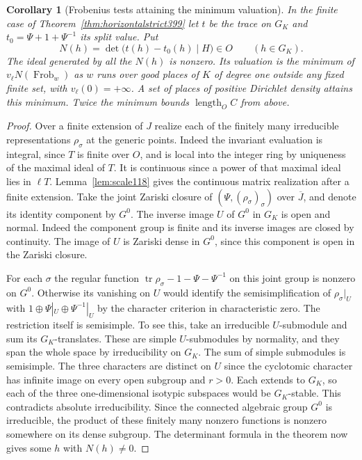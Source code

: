 \documentclass[a4paper,11pt]{article}
\newtheorem{corollary}[proposition]{Corollary}
\theoremstyle{definition}
\theoremstyle{remark}
\numberwithin{equation}{section}
\begin{document}
\begin{corollary}[Frobenius tests attaining the minimum valuation]\leavevmode
\label{cor:frobeniusstrict399}
In the finite case of Theorem~\ref{thm:horizontalstrict399} let
\(t\) be the trace on \(G_K\) and
\(t_0=\Psi+1+\Psi^{-1}\) its split value. Put
\[
     N(h)=\det\bigl(t(h)-t_0(h)\mid H\bigr)\in O
                               \qquad(h\in G_K).
\]
The ideal generated by all the \(N(h)\) is nonzero. Its
valuation is the minimum of \(v_\ell N(\operatorname{Frob}_w)\)
as \(w\) runs over good places of \(K\) of degree one outside
any fixed finite set, with \(v_\ell(0)=+\infty\). A set of
places of positive Dirichlet density attains this minimum. Twice
the minimum bounds \(\operatorname{length}_O C\) from above.
\end{corollary}
\begin{proof}
Over a finite extension of \(J\) realize each of the finitely many
irreducible representations \(\rho_\sigma\) at the generic points.
Indeed the invariant evaluation is integral, since \(T\) is finite
over \(O\), and is local into the integer ring by uniqueness of
the maximal ideal of \(T\). It is continuous since a power of
that maximal ideal lies in \(\ell T\). Lemma~\ref{lem:scale118}
gives the continuous matrix realization after a finite extension.
Take the joint Zariski closure of \((\Psi,(\rho_\sigma)_\sigma)\)
over \(\overline J\), and denote its identity component by \(G^0\).
The inverse image \(U\) of \(G^0\) in \(G_K\) is open and normal.
Indeed the component group is finite and its inverse images are
closed by continuity. The image of \(U\) is Zariski dense in
\(G^0\), since this component is open in the Zariski closure.

For each \(\sigma\) the regular function
\(\operatorname{tr}\rho_\sigma-1-\Psi-\Psi^{-1}\) on this joint
group is nonzero on \(G^0\). Otherwise its vanishing on \(U\)
would identify the semisimplification of \(\rho_\sigma|_U\)
with \(1\oplus\Psi|_U\oplus\Psi^{-1}|_U\) by the character
criterion in characteristic zero. The restriction itself is
semisimple. To see this, take an irreducible \(U\)-submodule and
sum its \(G_K\)-translates. These are simple \(U\)-submodules by
normality, and they span the whole space by irreducibility on
\(G_K\). The sum of simple submodules is semisimple. The three
characters are distinct on \(U\) since the cyclotomic character
has infinite image on every open subgroup and \(r>0\). Each
extends to \(G_K\), so each of the three one-dimensional
isotypic subspaces would be \(G_K\)-stable. This contradicts
absolute irreducibility. Since the connected algebraic group
\(G^0\) is irreducible, the product of these finitely many
nonzero functions is nonzero somewhere on its dense subgroup.
The determinant formula in the theorem now gives some \(h\)
with \(N(h)\ne0\).


\end{proof}
\end{document}
